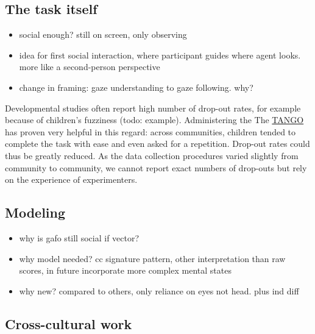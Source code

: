 \documentclass[
]{scrbook}
\providecommand{\tightlist}{%
  \setlength{\itemsep}{0pt}\setlength{\parskip}{0pt}}
\begin{document}
\subsection{The task itself}\label{the-task-itself}

\begin{itemize}
\tightlist
\item
  social enough? still on screen, only observing
\item
  idea for first social interaction, where participant guides where agent looks. more like a second-person perspective
\item
  change in framing: gaze understanding to gaze following. why?
\end{itemize}

Developmental studies often report high number of drop-out rates, for example because of children's fuzziness (todo: example). Administering the The \hyperref[acronyms_TANGO]{TANGO} has proven very helpful in this regard: across communities, children tended to complete the task with ease and even asked for a repetition. Drop-out rates could thus be greatly reduced. As the data collection procedures varied slightly from community to community, we cannot report exact numbers of drop-outs but rely on the experience of experimenters.

\subsection{Modeling}\label{modeling}

\begin{itemize}
\tightlist
\item
  why is gafo still social if vector?
\item
  why model needed? cc signature pattern, other interpretation than raw scores, in future incorporate more complex mental states
\item
  why new? compared to others, only reliance on eyes not head. plus ind diff
\end{itemize}

\subsection{Cross-cultural work}\label{cross-cultural-work}
\end{document}
